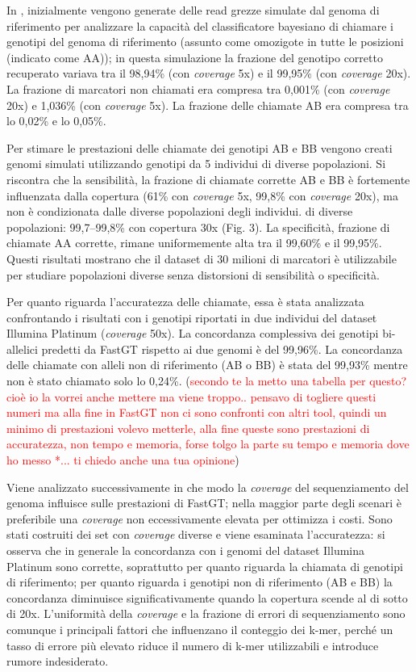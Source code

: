 \documentclass[../main.tex]{subfiles}
\begin{document}
In \cite{pajuste2017fastgt}, inizialmente vengono generate delle read grezze simulate dal genoma di riferimento per analizzare la capacità del classificatore bayesiano di chiamare i genotipi del genoma di riferimento (assunto come omozigote in tutte le posizioni (indicato come AA)); in questa simulazione la frazione del genotipo corretto recuperato variava tra il 98,94\% (con \textit{coverage} 5x) e il 99,95\% (con \textit{coverage} 20x). La frazione di marcatori non chiamati era compresa tra 0,001\% (con \textit{coverage} 20x) e 1,036\% (con \textit{coverage} 5x). La frazione delle chiamate AB era compresa tra lo 0,02\% e lo 0,05\%.
 
Per stimare le prestazioni delle chiamate dei genotipi AB e BB vengono creati genomi simulati utilizzando genotipi da 5 individui di diverse popolazioni. Si riscontra che la sensibilità, la frazione di chiamate corrette AB e BB è fortemente influenzata dalla copertura (61\% con \textit{coverage} 5x, 99,8\% con \textit{coverage} 20x), ma non è condizionata dalle diverse popolazioni degli individui. di diverse popolazioni: 99,7–99,8\% con copertura 30x (Fig. 3). La specificità, frazione di chiamate AA corrette, rimane uniformemente alta tra il 99,60\% e il 99,95\%. Questi risultati mostrano che il dataset di 30 milioni di marcatori è utilizzabile per studiare popolazioni diverse senza distorsioni di sensibilità o specificità.

Per quanto riguarda l'accuratezza delle chiamate, essa è stata analizzata confrontando i risultati con i genotipi riportati in due individui del dataset Illumina Platinum (\textit{coverage} 50x). La concordanza complessiva dei genotipi bi-allelici predetti da FastGT rispetto ai due genomi è del 99,96\%. La concordanza delle chiamate con alleli non di riferimento (AB o BB) è stata del 99,93\% mentre non è stato chiamato solo lo 0,24\%. (\textcolor{red}{secondo te la metto una tabella per questo? cioè io la vorrei anche mettere ma viene troppo.. pensavo di togliere questi numeri ma alla fine in FastGT non ci sono confronti con altri tool, quindi un minimo di prestazioni volevo metterle, alla fine queste sono prestazioni di accuratezza, non tempo e memoria, forse tolgo la parte su tempo e memoria dove ho messo *... ti chiedo anche una tua opinione})

Viene analizzato successivamente in che modo la \textit{coverage} del sequenziamento del genoma influisce sulle prestazioni di FastGT; nella maggior parte degli scenari è preferibile una \textit{coverage} non eccessivamente elevata per ottimizza i costi. Sono stati costruiti dei set con \textit{coverage} diverse e viene esaminata l'accuratezza: si osserva che in generale la concordanza con i genomi del dataset Illumina Platinum sono corrette, soprattutto per quanto riguarda la chiamata di genotipi di riferimento; per quanto riguarda i genotipi non di riferimento (AB e BB) la concordanza diminuisce significativamente quando la copertura scende al di sotto di 20x. L'uniformità della \textit{coverage} e la frazione di errori di sequenziamento sono comunque i principali fattori che influenzano il conteggio dei k-mer, perché un tasso di errore più elevato riduce il numero di k-mer utilizzabili e introduce rumore indesiderato. 
\end{document}
